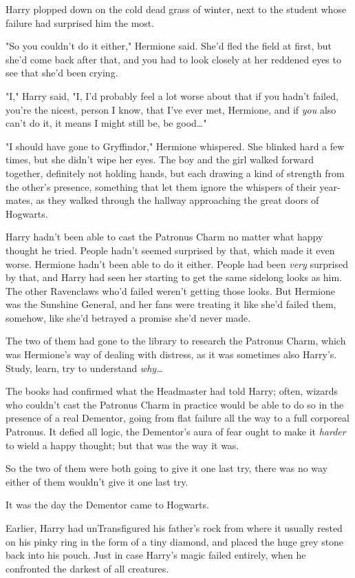 Harry plopped down on the cold dead grass of winter, next to the student whose
failure had surprised him the most.

"So you couldn't do it either," Hermione said. She'd fled the field at first,
but she'd come back after that, and you had to look closely at her reddened
eyes to see that she'd been crying.

"I," Harry said, "I, I'd probably feel a lot worse about that if you hadn't
failed, you're the nicest, person I know, that I've ever met, Hermione, and if
\emph{you} also can't do it, it means I might still be, be good{\ldots}"

"I should have gone to Gryffindor," Hermione whispered. She blinked hard a few
times, but she didn't wipe her eyes.
\later
The boy and the girl walked forward together, definitely not holding hands, but
each drawing a kind of strength from the other's presence, something that let
them ignore the whispers of their year-mates, as they walked through the
hallway approaching the great doors of Hogwarts.

Harry hadn't been able to cast the Patronus Charm no matter what happy thought
he tried. People hadn't seemed surprised by that, which made it even worse.
Hermione hadn't been able to do it either. People had been \emph{very}
surprised by that, and Harry had seen her starting to get the same sidelong
looks as him. The other Ravenclaws who'd failed weren't getting those looks.
But Hermione was the Sunshine General, and her fans were treating it like she'd
failed them, somehow, like she'd betrayed a promise she'd never made.

The two of them had gone to the library to research the Patronus Charm, which
was Hermione's way of dealing with distress, as it was sometimes also Harry's.
Study, learn, try to understand \emph{why{\ldots}}

The books had confirmed what the Headmaster had told Harry; often, wizards who
couldn't cast the Patronus Charm in practice would be able to do so in the
presence of a real Dementor, going from flat failure all the way to a full
corporeal Patronus. It defied all logic, the Dementor's aura of fear ought to
make it \emph{harder} to wield a happy thought; but that was the way it was.

So the two of them were both going to give it one last try, there was no way
either of them wouldn't give it one last try.

It was the day the Dementor came to Hogwarts.

Earlier, Harry had unTransfigured his father's rock from where it usually
rested on his pinky ring in the form of a tiny diamond, and placed the huge
grey stone back into his pouch. Just in case Harry's magic failed entirely,
when he confronted the darkest of all creatures.

